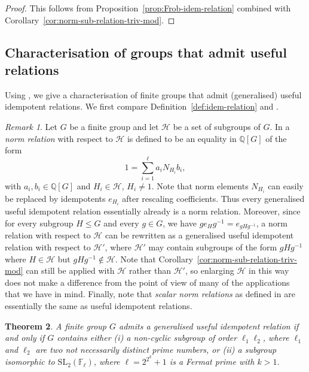 \documentclass[12pt]{amsart}
\theoremstyle{plain}
\newtheorem{theorem}{Theorem}[section]
\theoremstyle{remark}
\newtheorem{remark}[theorem]{Remark}
\theoremstyle{definition}
\newcommand{\Q}{\mathbb{Q}}
\newcommand{\F}{\mathbb{F}}
\numberwithin{equation}{section}
\begin{document}
\begin{proof}
This follows from Proposition~\ref{prop:Frob-idem-relation} combined with
Corollary~\ref{cor:norm-sub-relation-triv-mod}. 
\end{proof}

\subsection{Characterisation of groups that admit useful relations}\label{subsec:char-useful}
Using \cite[Theorem~2.11]{MR4440537}, we give a 
characterisation of finite groups that admit (generalised) useful idempotent relations.
We first compare Definition~\ref{def:idem-relation} and \cite[Definition~2.1]{MR4440537}. 

\begin{remark}\label{rmk:compare-GUIR-norm-relations}
Let $G$ be a finite group and let $\mathcal{H}$ be a set of subgroups of $G$. 
In \cite[Definition~2.1]{MR4440537} a \emph{norm relation} with respect to $\mathcal{H}$
is defined to be an equality in $\Q[G]$ of the form
\[
1 = \sum_{i=1}^{\ell} a_{i} N_{H_{i}} b_{i},
\]
with $a_{i}, b_{i} \in \Q[G]$ and $H_{i} \in \mathcal{H}$, $H_{i} \neq 1$.
Note that norm elements $N_{H_{i}}$ can easily be replaced by idempotents 
$e_{H_{i}}$ after rescaling coefficients. 
Thus every generalised useful idempotent relation essentially already is a norm relation.
Moreover, since for every subgroup $H \leq G$ and every $g \in G$, we have 
$ge_{H}g^{-1}=e_{gHg^{-1}}$, a norm relation with respect to $\mathcal{H}$
can be rewritten as a generalised useful idempotent relation with respect to $\mathcal{H}'$, where
$\mathcal{H}'$ may contain subgroups of the form $gHg^{-1}$ where $H \in \mathcal{H}$
but $gHg^{-1} \notin \mathcal{H}$. 
Note that Corollary~\ref{cor:norm-sub-relation-triv-mod} can still be applied with $\mathcal{H}$
rather than $\mathcal{H}'$, so enlarging $\mathcal{H}$ in this way
does not make a difference from the point of view of many of the applications that we have in mind.
Finally, note that \emph{scalar norm relations} as defined in \cite[Definition~2.1]{MR4440537}
are essentially the same as useful idempotent relations.
\end{remark}

\begin{theorem}\cite{MR4440537}\label{thm:existencenormrelation}
A finite group $G$ admits a generalised useful idempotent relation
if and only if $G$ contains either \textup{(i)} a non-cyclic subgroup of order $\ell_{1}\ell_{2}$,
where $\ell_{1}$ and $\ell_{2}$ are two not necessarily distinct prime numbers, or 
\textup{(ii)} a subgroup 
isomorphic to $\mathrm{SL}_{2}(\F_{\ell})$, where $\ell = 2^{2^{k}}+1$ is a Fermat prime
with $k>1$. 
\end{theorem}
\end{document}
